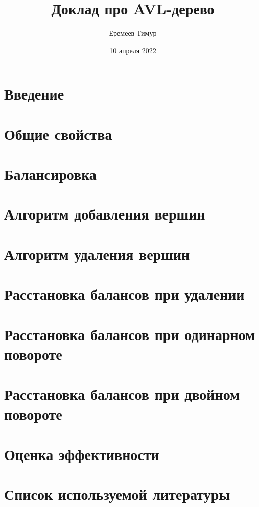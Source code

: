 \documentclass[a4paper, 12pt]{article}
\begin{document}
    \title{Доклад про AVL-дерево}
    \author{Еремеев Тимур}
    \date{10 апреля 2022}

    \maketitle

    \tableofcontents

    \section*{Введение}
    

    \section*{Общие свойства}
    

    \section*{Балансировка}
    

    \section*{Алгоритм добавления вершин}
    

    \section*{Алгоритм удаления вершин}
    

    \section*{Расстановка балансов при удалении}
    

    \section*{Расстановка балансов при одинарном повороте}
    

    \section*{Расстановка балансов при двойном повороте}
    

    \section*{Оценка эффективности}
    

    \section*{Список используемой литературы}
    
\end{document}
